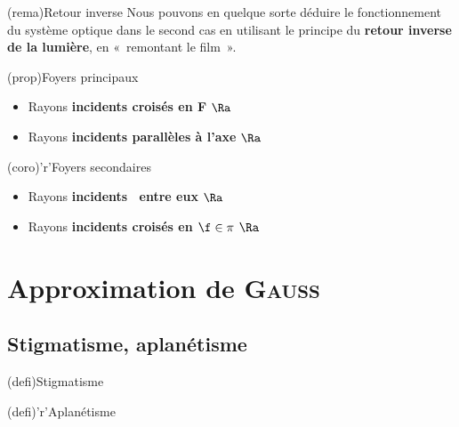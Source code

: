 \documentclass[../../main/main.tex]{subfiles}
\begin{document}
\begin{tcb}[label=rema:retinv](rema){Retour inverse}
	Nous pouvons en quelque sorte déduire le fonctionnement du système
	optique dans le second cas en utilisant le principe du \textbf{retour
		inverse de la lumière}, en «~remontant le film~».
\end{tcb}
\begin{tcbraster}[raster multicolumn=2]
	\begin{tcb}[label=prop:foy](prop){Foyers principaux}
		\begin{itemize}[label=$\diamond$, leftmargin=10pt]
			\item Rayons \textbf{incidents croisés en F} $\Ra$ 
			\item Rayons \textbf{incidents parallèles à l'axe} $\Ra$ 
		\end{itemize}
	\end{tcb}
	\begin{tcb}[label=coro:foysec](coro)'r'{Foyers secondaires}
		\begin{itemize}[label=$\diamond$, leftmargin=10pt]
			\item Rayons \textbf{incidents \parr\ entre eux} $\Ra$ 
			\item Rayons \textbf{incidents croisés en $\f \in \pi$} $\Ra$ 
		\end{itemize}
	\end{tcb}
\end{tcbraster}

\section{Approximation de \textsc{Gauss}}

\subsection{Stigmatisme, aplanétisme}

\begin{tcbraster}[raster columns=2, raster equal height=rows]
	\begin{tcb}[label=def:stig](defi){Stigmatisme}
	\end{tcb}
	\begin{tcb}[label=def:apla](defi)'r'{Aplanétisme}
	\end{tcb}
\end{tcbraster}
\end{document}
